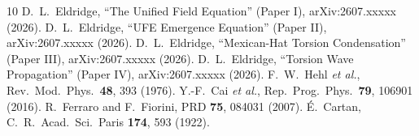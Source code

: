 \documentclass[twocolumn,prd,superscriptaddress,nofootinbib]{revtex4-2}
\begin{document}
\begin{thebibliography}{10}
 D.~L.~Eldridge, ``The Unified Field Equation'' (Paper I), arXiv:2607.xxxxx (2026).
 D.~L.~Eldridge, ``UFE Emergence Equation'' (Paper II), arXiv:2607.xxxxx (2026).
 D.~L.~Eldridge, ``Mexican-Hat Torsion Condensation'' (Paper III), arXiv:2607.xxxxx (2026).
 D.~L.~Eldridge, ``Torsion Wave Propagation'' (Paper IV), arXiv:2607.xxxxx (2026).
 F.~W.~Hehl \textit{et al.}, Rev.\ Mod.\ Phys.\ \textbf{48}, 393 (1976).
 Y.-F.~Cai \textit{et al.}, Rep.\ Prog.\ Phys.\ \textbf{79}, 106901 (2016).
 R.~Ferraro and F.~Fiorini, PRD \textbf{75}, 084031 (2007).
 \'E.~Cartan, C.~R.\ Acad.\ Sci.\ Paris \textbf{174}, 593 (1922).
\end{thebibliography}
\end{document}
